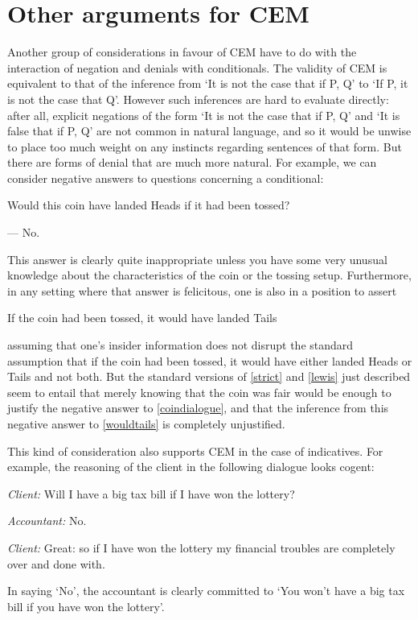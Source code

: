 \documentclass[If.tex]{subfiles}
\begin{document}
\section{Other arguments for CEM}
Another group of considerations in favour of CEM have to do with the interaction of negation and denials with conditionals. The validity of CEM is equivalent to that of the inference from ‘It is not the case that if P, Q’ to ‘If P, it is not the case that Q’. However such inferences are hard to evaluate directly: after all, explicit negations of the form ‘It is not the case that if P, Q’ and ‘It is false that if P, Q’ are not common in natural language, and so it would be unwise to place too much weight on any instincts regarding sentences of that form. But there are forms of denial that are much more natural. For example, we can consider negative answers to questions concerning a conditional:
\begin{prop}
\nitem \label{coindialogue}
  \begin{prop}
      \item
		 Would this coin have landed Heads if it had been tossed?
		 \item
		 --- No.
  \end{prop}
\end{prop}
This answer is clearly quite inappropriate unless you have some very unusual knowledge about the characteristics of the coin or the tossing setup. Furthermore, in any setting where that answer is felicitous, one is also in a position to assert
\begin{prop}
\nitem \label{wouldtails}
  If the coin had been tossed, it would have landed Tails
\end{prop}
assuming that one's insider information does not disrupt the standard assumption that if the coin had been tossed, it would have either landed Heads or Tails and not both. But the standard versions of \ref{strict} and \ref{lewis} just described seem to entail that merely knowing that the coin was fair would be enough to justify the negative answer to \ref{coindialogue}, and that the inference from this negative answer to \ref{wouldtails} is completely unjustified.

This kind of consideration also supports CEM in the case of indicatives. For example, the reasoning of the client in the following dialogue looks cogent:
\begin{prop}
	\nitem \label{taxdialogue}
		\emph{Client:} Will I have a big tax bill if I have won the lottery?

		\emph{Accountant:} No.

		\emph{Client:} Great: so if I have won the lottery my financial
		troubles are completely over and done with.
\end{prop}
In saying ‘No’, the accountant is clearly committed to `You won't have a
big tax bill if you have won the lottery'.
\end{document}

